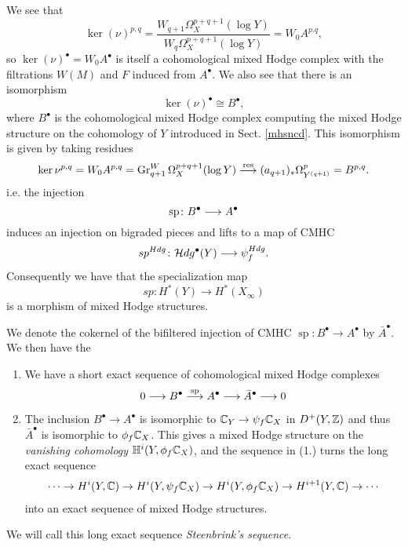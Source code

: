\documentclass[../main.tex]{subfiles}
\begin{document}
We see that
\[\ker(\nu)^{p,q}= \frac{W_{q+1} \Omega^{p+q+1}_{{X}}(\log Y) }{W_q\Omega^{p+q+1}_{{X}}(\log Y)} = W_0 A^{p.q},\]
so $\ker(\nu)^{\bullet} = W_0 A^{\bullet}$ is itself a cohomological mixed Hodge complex with the filtrations $W(M)$ and $F$ induced from $A^{\bullet}$.
We also see that there is an isomorphism
\[\ker(\nu)^{\bullet}\cong B^\bullet,\]
where $B^\bullet$ is the cohomological mixed Hodge complex computing the mixed Hodge structure on the cohomology of $Y$ introduced in Sect. \ref{mhsncd}. This isomorphism is given by taking residues
\[\ker \nu^{p,q} = W_0A^{p,q}= \operatorname{Gr}^W_{q+1} \Omega^{p+q+1}_{{X}}(\log Y) \stackrel{\operatorname{res}}{\longrightarrow} (a_{q+1})_*\Omega^p_{{Y}^{(q+1)}} = B^{p,q} .\]
i.e. the injection
\[\operatorname{sp}\colon B^{\bullet}\longrightarrow A^\bullet\]
induces an injection on bigraded pieces and lifts to a map of CMHC 
\[
 sp^{Hdg} \colon \mathcal{H}dg^\bullet(Y) \longrightarrow \psi^{Hdg}_f.
\]
 Consequently we have that the specialization map
\[
sp \colon H^*(Y) \to H^*(X_\infty)
\]
is a morphism of mixed Hodge structures.

We denote the cokernel of the bifiltered injection of CMHC $\operatorname{sp} \colon B^\bullet \to A^\bullet$ by $\bar A^\bullet$.
We then have the
\begin{theorem} \cite[Thm. 4.5]{GKR17}\label{MHSonvanishing}
     \begin{enumerate}
         \item We have a short exact sequence of cohomological mixed Hodge complexes
         \[0\longrightarrow B^\bullet\stackrel{\operatorname{sp}}{\longrightarrow} A^\bullet \longrightarrow \bar A^\bullet \longrightarrow 0\]
         \item The inclusion $B^\bullet \to A^\bullet$ is isomorphic to $\mathbb{C}_Y \to \psi_f \mathbb{C}_X$ in $D^+(Y, \mathbb{Z})$ and thus $\bar A^\bullet$ is isomorphic to $\phi_f \mathbb{C}_X$. This gives a mixed Hodge structure on the \emph{vanishing cohomology} $\mathbb{H}^i(Y,\phi_f \mathbb{C}_X)$, and the sequence in (1.) turns the long exact sequence 
         \begin{align*}
             \cdots \to H^i(Y, \mathbb{C}) \to H^i(Y, \psi_f \mathbb{C}_X) \to H^i(Y, \phi_f \mathbb{C}_X) \to H^{i+1}(Y, \mathbb{C}) \to \cdots
         \end{align*}
into an exact sequence of mixed Hodge structures. 
     \end{enumerate} 
\end{theorem}
 We will call this long exact sequence \emph{Steenbrink's sequence}. 
 
\end{document}
